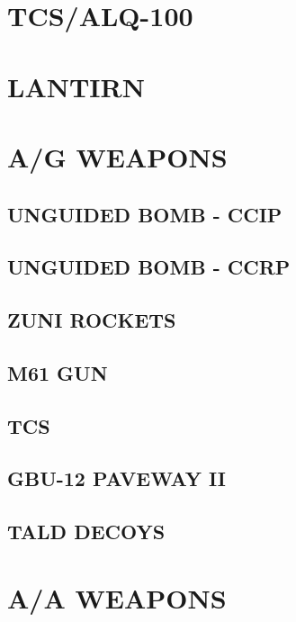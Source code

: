 \documentclass[8pt,usenames,dvipsnames,twoside]{article}
\begin{document}
\begin{multicols*}{2}
		\cleardoublepage
		
		\section{TCS/ALQ-100}
		
		\cleardoublepage
		
		\section{LANTIRN}
		
		\cleardoublepage
		
		\section{A/G WEAPONS}
		
		\subsection{UNGUIDED BOMB - CCIP}
		\subsection{UNGUIDED BOMB - CCRP}
		\subsection{ZUNI ROCKETS}
		\subsection{M61 GUN}
		\subsection{TCS}
		\subsection{GBU-12 PAVEWAY II}
		\subsection{TALD DECOYS}
		
		\cleardoublepage
		
		\section{A/A WEAPONS}
		

\end{multicols*}
\end{document}
